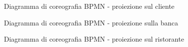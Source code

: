 \documentclass[11pt]{article} %
\begin{document}
\begin{figure}[!ht]
\begin{center}
\caption{Diagramma di coreografia BPMN - proiezione sul cliente}
\end{center}
\end{figure}

\begin{figure}[!ht]
\begin{center}
\caption{Diagramma di coreografia BPMN - proiezione sulla banca}
\end{center}
\end{figure}

\begin{figure}[!ht]
\begin{center}
\caption{Diagramma di coreografia BPMN - proiezione sul ristorante}
\end{center}
\end{figure}
\end{document}
